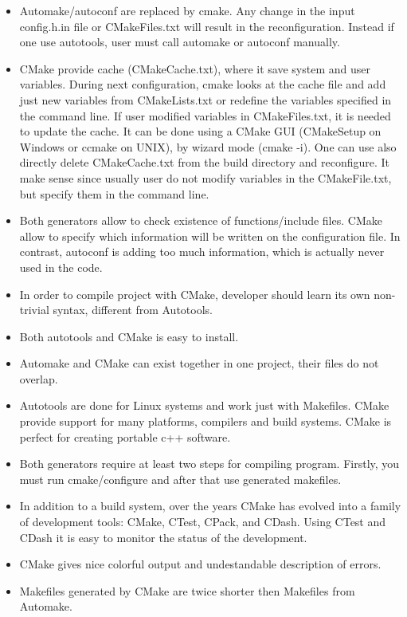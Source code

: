 \documentclass[a4paper,10pt]{article}
\begin{document}
\begin{itemize}
 \item  Automake/autoconf are replaced by cmake. Any change in the input config.h.in file or CMakeFiles.txt will result in the reconfiguration. Instead if one use autotools, user must call automake or autoconf manually.
 \item  CMake provide cache (CMakeCache.txt), where it save system and user variables. During next configuration, cmake looks at the cache file and add just new variables from CMakeLists.txt or redefine the variables specified in the command line.  If user modified variables in CMakeFiles.txt, it is needed to update the cache. It can be done using a CMake GUI (CMakeSetup on Windows or ccmake on UNIX), by wizard mode (cmake -i). One can use also directly delete CMakeCache.txt from the build directory and reconfigure. It make sense since usually user do not modify variables in the CMakeFile.txt, but specify them in the command line.
 \item  Both generators allow to check existence of functions/include files. CMake allow to specify which information will be written on the configuration file. In contrast, autoconf is adding too much information, which is actually never used in the code.
 \item  In order to compile project with CMake, developer should learn its own non-trivial syntax, different from Autotools.
 \item  Both autotools and CMake is easy to install. 
 \item  Automake and CMake can exist together in one project, their files do not overlap.
 \item  Autotools are done for Linux systems and work just with Makefiles. CMake provide support for many platforms, compilers and build systems. CMake is perfect for creating portable c++ software.
 \item  Both generators require at least two steps for compiling program. Firstly, you must run cmake/configure and after that use generated makefiles. 
 \item  In addition to a build system, over the years CMake has evolved into a family of development tools: CMake, CTest, CPack, and CDash. Using CTest and CDash it is easy to monitor the status of the development.
 \item CMake gives nice colorful output and undestandable description of errors.
 \item Makefiles generated by CMake are twice shorter then Makefiles from Automake.
\end{itemize}
\end{document}
